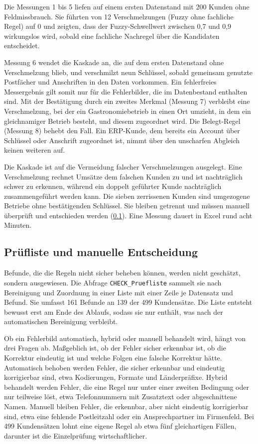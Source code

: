 \documentclass[a4paper,12pt]{article}
\newcommand{\pq}[1]{\texttt{#1}}        %
\begin{document}
Die Messungen 1 bis 5 liefen auf einem ersten Datenstand mit 200 Kunden ohne Feldmissbrauch. Sie führten von 12 Verschmelzungen (Fuzzy ohne fachliche Regel) auf 0 und zeigten, dass der Fuzzy-Schwellwert zwischen 0,7 und 0,9 wirkungslos wird, sobald eine fachliche Nachregel über die Kandidaten entscheidet.

Messung 6 wendet die Kaskade an, die auf dem ersten Datenstand ohne Verschmelzung blieb, und verschmilzt neun Schlüssel, sobald gemeinsam genutzte Postfächer und Anschriften in den Daten vorkommen. Ein fehlerfreies Messergebnis gilt somit nur für die Fehlerbilder, die im Datenbestand enthalten sind. Mit der Bestätigung durch ein zweites Merkmal (Messung 7) verbleibt eine Verschmelzung, bei der ein Gastronomiebetrieb in einen Ort umzieht, in dem ein gleichnamiger Betrieb besteht, und diesem zugeordnet wird. Die Belegt-Regel (Messung 8) behebt den Fall. Ein ERP-Kunde, dem bereits ein Account über Schlüssel oder Anschrift zugeordnet ist, nimmt über den unscharfen Abgleich keinen weiteren auf.

Die Kaskade ist auf die Vermeidung falscher Verschmelzungen ausgelegt. Eine Verschmelzung rechnet Umsätze dem falschen Kunden zu und ist nachträglich schwer zu erkennen, während ein doppelt geführter Kunde nachträglich zusammengeführt werden kann. Die sieben zerrissenen Kunden sind umgezogene Betriebe ohne bestätigenden Schlüssel. Sie bleiben getrennt und müssen manuell überprüft und entschieden werden (\cref{sec:pruefliste}). Eine Messung dauert in Excel rund acht Minuten.

\subsection{Prüfliste und manuelle Entscheidung}\label{sec:pruefliste}

Befunde, die die Regeln nicht sicher beheben können, werden nicht geschätzt, sondern ausgewiesen. Die Abfrage \pq{CHECK\_Pruefliste} sammelt sie nach Bereinigung und Zuordnung in einer Liste mit einer Zeile je Datensatz und Befund. Sie umfasst 161 Befunde an 139 der 499 Kundensätze. Die Liste entsteht bewusst erst am Ende des Ablaufs, sodass sie nur enthält, was nach der automatischen Bereinigung verbleibt.

Ob ein Fehlerbild automatisch, hybrid oder manuell behandelt wird, hängt von drei Fragen ab. Maßgeblich ist, ob der Fehler sicher erkennbar ist, ob die Korrektur eindeutig ist und welche Folgen eine falsche Korrektur hätte. Automatisch behoben werden Fehler, die sicher erkennbar und eindeutig korrigierbar sind, etwa Kodierungen, Formate und Länderpräfixe. Hybrid behandelt werden Fehler, die eine Regel nur unter einer zweiten Bedingung oder nur teilweise löst, etwa Telefonnummern mit Zusatztext oder abgeschnittene Namen. Manuell bleiben Fehler, die erkennbar, aber nicht eindeutig korrigierbar sind, etwa eine fehlende Postleitzahl oder ein Ansprechpartner im Firmenfeld. Bei 499 Kundensätzen lohnt eine eigene Regel ab etwa fünf gleichartigen Fällen, darunter ist die Einzelprüfung wirtschaftlicher.
\end{document}
